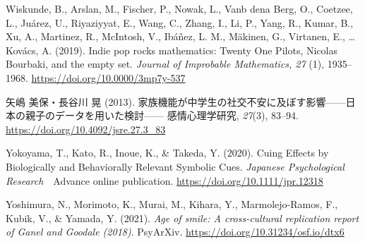 Wiskunde, B., Arslan, M., Fischer, P., Nowak, L., Vanb dena Berg, O., Coetzee, L., Juárez, U., Riyaziyyat, E., Wang, C., Zhang, I., Li, P., Yang, R., Kumar, B., Xu, A., Martinez, R., McIntosh, V., Ibáñez, L. M., Mäkinen, G., Virtanen, E., {\ldots} Kovács, A. (2019). Indie pop rocks mathematics: Twenty One Pilots, Nicolas Bourbaki, and the empty set. \textit{Journal of Improbable Mathematics, 27} (1), 1935--1968. \url{https://doi.org/10.0000/3mp7y-537}

矢嶋 美保・長谷川 晃 (2013). 家族機能が中学生の社交不安に及ぼす影響------日本の親子のデータを用いた検討------ 感情心理学研究, \textit{27}(3), 83--94. \url{https://doi.org/10.4092/jsre.27.3_83}

Yokoyama, T., Kato, R., Inoue, K., \& Takeda, Y. (2020). Cuing Effects by Biologically and Behaviorally Relevant Symbolic Cues. \textit{Japanese Psychological Research}　Advance online publication. \url{https://doi.org/10.1111/jpr.12318}

Yoshimura, N., Morimoto, K., Murai, M., Kihara, Y., Marmolejo-Ramos, F., Kubik, V., \& Yamada, Y. (2021). \textit{Age of smile: A cross-cultural replication report of Ganel and Goodale (2018)}. PsyArXiv. \url{https://doi.org/10.31234/osf.io/dtx6}